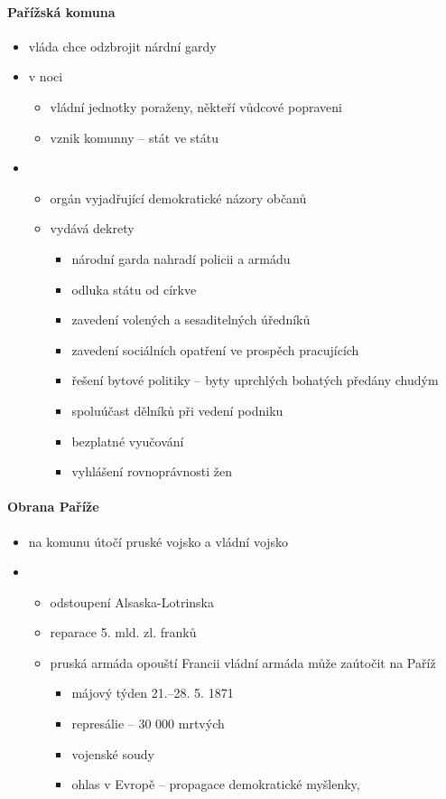 \paragraph{Pařížská komuna}
\begin{itemize}
\item vláda chce odzbrojit nárdní gardy
\item v noci 
	\begin{itemize}
	\item vládní jednotky poraženy, někteří vůdcové popraveni
	\item vznik komunny -- stát ve státu
	\end{itemize}
\item {}
	\begin{itemize}
	\item orgán vyjadřující demokratické názory občanů
	\item vydává dekrety
		\begin{itemize}
		\item národní garda nahradí policii a  armádu
		\item odluka státu od církve
		\item zavedení volených a sesaditelných úředníků
		\item zavedení sociálních opatření ve prospěch pracujících
		\item řešení bytové politiky -- byty uprchlých bohatých předány chudým
		\item spoluúčast dělníků při vedení podniku
		\item bezplatné vyučování
		\item vyhlášení rovnoprávnosti žen
		\end{itemize}
	\end{itemize}
\end{itemize}

\paragraph{Obrana Paříže}
\begin{itemize}
\item na komunu útočí pruské vojsko a vládní vojsko
\item {}
	\begin{itemize}
	\item odstoupení Alsaska-Lotrinska
	\item reparace 5. mld. zl. franků
	\item pruská armáda opouští Francii \ra vládní armáda může zaútočit na Paříž
		\begin{itemize}
		\item májový týden 21.--28. 5. 1871
		\item represálie -- 30 000 mrtvých
		\item vojenské soudy
		\item ohlas v Evropě -- propagace demokratické myšlenky, 
		\end{itemize}
	\end{itemize}
\end{itemize}

